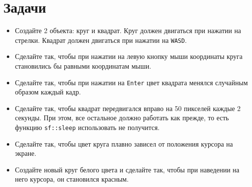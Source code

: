 \documentclass{article}
\begin{document}
\section{Задачи}
\begin{itemize}
\item Создайте 2 объекта: круг и квадрат. Круг должен двигаться при нажатии на стрелки. Квадрат должен двигаться при нажатии на \texttt{WASD}.
\item Сделайте так, чтобы при нажатии на левую кнопку мыши координаты круга становились бы равными координатам мыши.
\item Сделайте так, чтобы при нажатии на \texttt{Enter} цвет квадрата менялся случайным образом каждый кадр.
\item Сделайте так, чтобы квадрат передвигался вправо на 50 пикселей каждые 2 секунды. При этом, все остальное должно работать как прежде, то есть функцию \texttt{sf::sleep} использовать не получится.
\item Сделайте так, чтобы цвет круга плавно зависел от положения курсора на экране.

\item Создайте новый круг белого цвета и сделайте так, чтобы при наведении на него курсора, он становился красным.
\end{itemize}

\newpage
\end{document}

